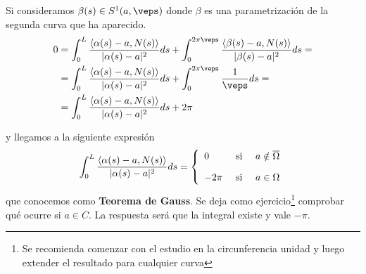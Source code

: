 \begin{observacion}
\begin{enumerate}[start=4]
\begin{enumerate}
            \begin{figure}[H]
                \centering
            \end{figure}
            Si consideramos $\beta(s)\in S^1(a,\veps)$ donde $\beta$ es una parametrización de la segunda curva que ha aparecido.
            \begin{align*}
                0 &= \int_0^L \frac{\langle \alpha(s)-a, N(s)\rangle}{|\alpha(s)-a|^2} ds +\int_0^{2\pi \veps} \frac{\langle \beta(s)-a, N(s)\rangle}{|\beta(s)-a|^2} ds = \\
                &= \int_0^L \frac{\langle \alpha(s)-a, N(s)\rangle}{|\alpha(s)-a|^2} ds +\int_0^{2\pi \veps} \frac{1}{\veps} ds= \\
                &= \int_0^L \frac{\langle \alpha(s)-a, N(s)\rangle}{|\alpha(s)-a|^2} ds + 2 \pi
            \end{align*}
        \end{enumerate}
        y llegamos a la siguiente expresión
        \begin{gather*}
            \int_0^L \frac{\langle \alpha(s)-a, N(s) \rangle}{|\alpha(s)-a|^2} ds = 
            \left\{
                \begin{array}{l c c}
                    0 & \text{ si } & a\notin \overline{\Omega}\\[1em]
                    -2\pi & \text{ si } & a\in \Omega
                \end{array}
            \right.
        \end{gather*}
        que conocemos como \textbf{Teorema de Gauss}. Se deja como ejercicio\footnote{Se recomienda comenzar con el estudio en la circunferencia unidad y luego extender el resultado para cualquier curva} comprobar qué ocurre si $a\in C$. La respuesta será que la integral existe y vale $-\pi$.        


\end{enumerate}
\end{observacion}
